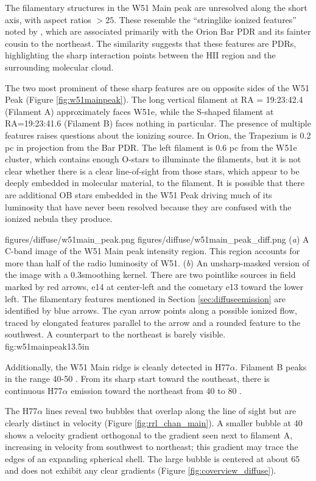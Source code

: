 The filamentary structures in the W51 Main peak are unresolved along the short
axis, with aspect ratios $>25$.   These resemble the ``stringlike ionized
features'' noted by \citet[][see
\url{http://images.nrao.edu/402}]{Yusef-Zadeh1990a}, which are associated
primarily with the Orion Bar PDR and its fainter cousin to the northeast.  The
similarity suggests that these features are PDRs, highlighting the sharp
interaction points between the HII region and the surrounding molecular cloud.

The two most prominent of these sharp features are on opposite sides of the W51
Peak (Figure \ref{fig:w51mainpeak}).  The long vertical filament at RA =
19:23:42.4 (Filament A) approximately
faces W51e, while the S-shaped filament at RA=19:23:41.6 (Filament B) faces
nothing in particular.  The presence of multiple features raises questions
about the ionizing source.  In Orion, the Trapezium is 0.2 pc in projection
from the Bar PDR.  The left filament is 0.6 pc from the W51e cluster, which
contains enough O-stars to illuminate the filaments, but it is not clear
whether there is a clear line-of-sight from those stars, which appear to be
deeply embedded in molecular material, to the filament.  It is possible that
there are additional OB stars embedded in the W51 Peak driving much of its
luminosity that have never been resolved because they are confused with the
ionized nebula they produce.

\FigureTwo
{figures/diffuse/w51main_peak.png}
{figures/diffuse/w51main_peak_diff.png}
{({\it a}) A C-band image of the W51 Main peak intensity region.  This region
accounts for more than half of the radio luminosity of W51.
({\it b}) An unsharp-masked version of the image with a 0.3\arcsec smoothing
kernel. 
There are
two pointlike sources in field marked by red arrows, e14 at center-left and the
cometary e13 toward the lower left.
The filamentary features mentioned in Section \ref{sec:diffuseemission} are
identified by blue arrows.  The cyan arrow points along a possible ionized flow,
traced by elongated features parallel to the arrow and a rounded feature to the
southwest.  A counterpart to the northeast is barely visible.
}
{fig:w51mainpeak}{1}{3.5in}

Additionally, the W51 Main ridge is cleanly detected in H77$\alpha$.  Filament
B peaks in the range 40-50 \kms.  From its sharp start toward the southeast,
there is continuous H77$\alpha$ emission toward the northeast from 40 to 80
\kms.

The H77$\alpha$ lines reveal two bubbles that overlap along the line of sight
but are clearly distinct in velocity (Figure \ref{fig:rrl_chan_main}).  A
smaller bubble at 40 \kms shows a velocity gradient orthogonal to the gradient
seen next to filament A, increasing in velocity from southwest to northeast;
this gradient may trace the edges of an expanding spherical shell.  The large
bubble is centered at about 65 \kms and does not exhibit any clear gradients
(Figure \ref{fig:coverview_diffuse}).

